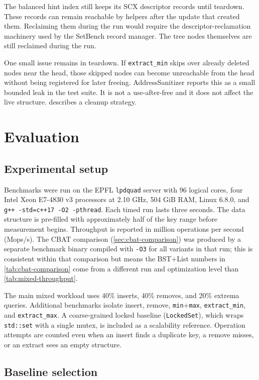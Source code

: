 \documentclass[a4paper,11pt]{article}
\newcommand{\code}[1]{\texttt{#1}}
\begin{document}
The balanced hint index still keeps its SCX descriptor records until teardown. These records can remain reachable by helpers after the update that created them. Reclaiming them during the run would require the descriptor-reclamation machinery used by the SetBench record manager. The tree nodes themselves are still reclaimed during the run.

One small issue remains in teardown. If \code{extract\_min} skips over already deleted nodes near the head, those skipped nodes can become unreachable from the head without being registered for later freeing. AddressSanitizer reports this as a small bounded leak in the test suite. It is not a use-after-free and it does not affect the live structure.  describes a cleanup strategy.

\section{Evaluation}

\subsection{Experimental setup}

Benchmarks were run on the EPFL \code{lpdquad} server with 96 logical cores, four Intel Xeon E7-4830 v3 processors at 2.10 GHz, 504 GiB RAM, Linux 6.8.0, and \code{g++ -std=c++17 -O2 -pthread}. Each timed run lasts three seconds. The data structure is pre-filled with approximately half of the key range before measurement begins. Throughput is reported in million operations per second (Mops/s). The CBAT comparison (\cref{sec:cbat-comparison}) was produced by a separate benchmark binary compiled with \code{-O3} for all variants in that run; this is consistent within that comparison but means the BST+List numbers in \cref{tab:cbat-comparison} come from a different run and optimization level than \cref{tab:mixed-throughput}.

The main mixed workload uses 40\% inserts, 40\% removes, and 20\% extrema queries. Additional benchmarks isolate insert, remove, \code{min}+\code{max}, \code{extract\_min}, and \code{extract\_max}. A coarse-grained locked baseline (\code{LockedSet}), which wraps \code{std::set} with a single mutex, is included as a scalability reference. Operation attempts are counted even when an insert finds a duplicate key, a remove misses, or an extract sees an empty structure.

\subsection{Baseline selection}
\label{sec:eval-baselines}
\end{document}
